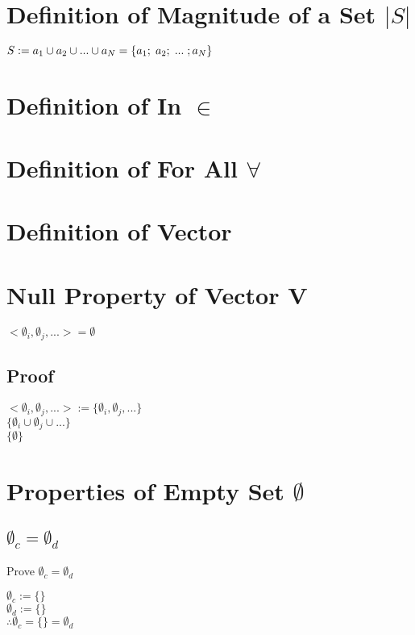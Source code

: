 \documentclass[11pt]{article}
\begin{document}
\section{Definition of Magnitude of a Set $|S|$}
\begin{center}
$
S := a_1 \cup a_2 \cup ... \cup a_N = \{a_1; \hspace{1mm} a_2; \hspace{1mm} ... \hspace{1mm}; a_N\}
$
\end{center}



\section{Definition of In $\in$}
\section{Definition of For All $\forall$}




\section{Definition of Vector}
\section{Null Property of Vector V}
\begin{center}
$
< \emptyset_i, \emptyset_j, ... > = \emptyset
$
\end{center}
\subsection{Proof}
\begin{center}
$
< \emptyset_i, \emptyset_j, ... > := \{ \emptyset_i, \emptyset_j,...\}
$
\\ \vspace{2mm}
$
\{\emptyset_i\cup \emptyset_j \cup...\}
$
\\ \vspace{2mm}
$
\{\emptyset\}
$
\end{center}




\section{Properties of Empty Set $\emptyset$}
\subsection{$\emptyset_c = \emptyset_d$}
Prove $\emptyset_c = \emptyset_d$
\begin{center}
$
\emptyset_c := \{\}
$
\\ \vspace{2mm}
$
\emptyset_d := \{\}
$
\\ \vspace{2mm}
$
\therefore \emptyset_c = \{\} = \emptyset_d
$
\end{center}
\end{document}
